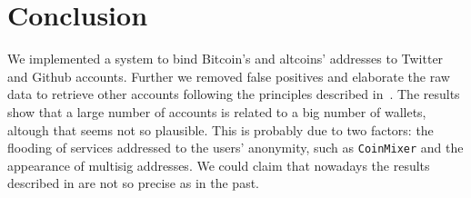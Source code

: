\section{Conclusion} \label{conclusion}
We implemented a system to bind Bitcoin's and altcoins' addresses to Twitter
and Github accounts. Further we removed false positives and elaborate the raw
data to retrieve other accounts following the principles described
in~\cite{bib:fistful}.
The results show that a large number of accounts is related to a big number of
wallets, altough that seems not so plausible.
This is probably due to two factors: the
flooding of services addressed to the users' anonymity, such as
\texttt{CoinMixer} and the appearance of multisig addresses. We could claim
that nowadays the results described in \cite{bib:fistful} are not so precise
as in the past.
